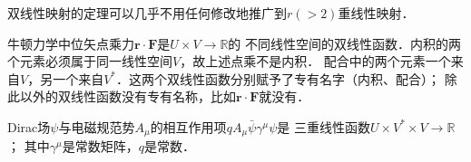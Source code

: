 双线性映射的定理可以几乎不用任何修改地推广到$r(>2)$重线性映射．

\begin{example}
    牛顿力学中位矢点乘力$\boldsymbol{r}\cdot \boldsymbol{F}$是$U\times V \to \mathbb{R}$的
    不同线性空间的双线性函数．{\kaishu 内积}的两个元素必须属于同一线性空间$V$，故上述点乘不是内积．
    {\kaishu 配合}中的两个元素一个来自$V$，另一个来自$V^*$．这两个双线性函数分别赋予了专有名字（内积、配合）；
    除此以外的双线性函数没有专有名称，比如$\boldsymbol{r}\cdot \boldsymbol{F}$就没有．
\end{example}

\begin{example}
    Dirac场$\psi$与电磁规范势$A_\mu$的相互作用项$q A_\mu \bar{\psi}\gamma^\mu \psi$是
    三重线性函数$U\times V^* \times V\to \mathbb{R}$； 其中$\gamma^\mu$是常数矩阵，$q$是常数．
\end{example}

